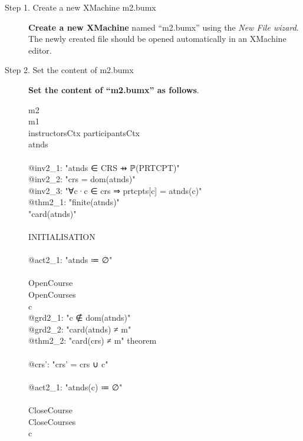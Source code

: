 \begin{description}
\item[Step 1. Create a new XMachine m2.bumx] \textbf{Create a new XMachine} named ``m2.bumx'' using the \emph{New File wizard}. The newly created file should be opened automatically in an XMachine editor.

\item[Step 2. Set the content of m2.bumx] \textbf{Set the content of ``m2.bumx'' as follows}.
  \begin{center}
    \begin{Bcode}
      \ifplastex
      \Bmachine{} m2\\
      \Brefines{} m1\\
      \Bsees{} instructorsCtx participantsCtx\\
      \Bvariables{} atnds\\
      \Binvariants\\
      @inv2_1: "atnds ∈ CRS ⇸ ℙ(PRTCPT)"\\
      @inv2_2: "crs = dom(atnds)"\\
      @inv2_3: "∀c·c ∈ crs ⇒ prtcpts[{c}] = atnds(c)"\\
      @thm2_1: "finite(atnds)" \Btheorem\\
      \Bvariant{} "card(atnds)"\\
      \Bevents\\
      INITIALISATION\\
      \Bbegin\\
      @act2_1: "atnds ≔ ∅"\\
      \Bend\\
      OpenCourse\\
      \Brefines{} OpenCourses\\
      \Bany{} c \Bwhere\\
      @grd2_1: "c ∉ dom(atnds)"\\
      @grd2_2: "card(atnds) ≠ m" \\
      @thm2_2: "card(crs) ≠ m" theorem\\
      \Bwith\\
      @crs': "crs' = crs ∪ {c}"\\
      \Bthen\\
      @act2_1: "atnds(c) ≔ ∅"\\
      \Bend\\
      CloseCourse \Bconvergent\\
      \Brefines{} CloseCourses\\
      \Bany{} c \Bwhere\\

\end{Bcode}
\end{center}
\end{description}
